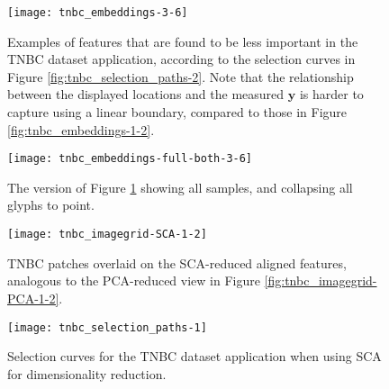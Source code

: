 \begin{figure}
  \centering
  \texttt{[image: tnbc\_embeddings-3-6]}
  \caption{Examples of features that are found to be less important in the TNBC
    dataset application, according to the selection curves in Figure
    \ref{fig:tnbc_selection_paths-2}. Note that the relationship between the
    displayed locations and the measured $\mathbf{y}$ is harder to capture using
    a linear boundary, compared to those in Figure
    \ref{fig:tnbc_embeddings-1-2}.}
  \label{fig:tnbc_embeddings-3-6}
\end{figure}

\begin{figure}
\centering
  \texttt{[image: tnbc\_embeddings-full-both-3-6]}
  \caption{The version of Figure \ref{fig:tnbc_embeddings-3-6} showing all
    samples, and collapsing all glyphs to point.}
  \label{fig:tnbc_embeddings-full-both-3-6}
\end{figure}

\begin{figure}
\centering
  \texttt{[image: tnbc\_imagegrid-SCA-1-2]}
  \caption{TNBC patches overlaid on the SCA-reduced aligned features, analogous
    to the PCA-reduced view in Figure \ref{fig:tnbc_imagegrid-PCA-1-2}.}
  \label{fig:tnbc_imagegrid-SCA-1-2}
\end{figure}

\begin{figure}
  \centering
  \texttt{[image: tnbc\_selection\_paths-1]}
  \caption{Selection curves for the TNBC dataset application when using SCA for
    dimensionality reduction.}
  \label{fig:tnbc_selection_paths-1}
\end{figure}
